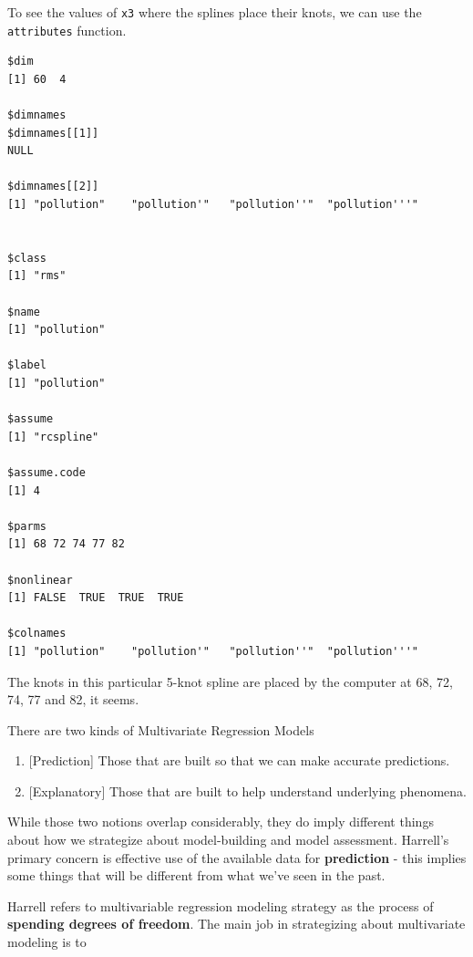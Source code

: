 \documentclass[]{book}
\newenvironment{Shaded}{\begin{snugshade}}{\end{snugshade}}
\newcommand{\KeywordTok}[1]{\textcolor[rgb]{0.13,0.29,0.53}{\textbf{#1}}}
\newcommand{\DecValTok}[1]{\textcolor[rgb]{0.00,0.00,0.81}{#1}}
\newcommand{\OperatorTok}[1]{\textcolor[rgb]{0.81,0.36,0.00}{\textbf{#1}}}
\newcommand{\NormalTok}[1]{#1}
\providecommand{\tightlist}{%
  \setlength{\itemsep}{0pt}\setlength{\parskip}{0pt}}
\theoremstyle{definition}
\theoremstyle{definition}
\theoremstyle{definition}
\theoremstyle{remark}
\begin{document}
To see the values of \texttt{x3} where the splines place their knots, we
can use the \texttt{attributes} function.

\begin{Shaded}
\end{Shaded}

\begin{verbatim}
$dim
[1] 60  4

$dimnames
$dimnames[[1]]
NULL

$dimnames[[2]]
[1] "pollution"    "pollution'"   "pollution''"  "pollution'''"


$class
[1] "rms"

$name
[1] "pollution"

$label
[1] "pollution"

$assume
[1] "rcspline"

$assume.code
[1] 4

$parms
[1] 68 72 74 77 82

$nonlinear
[1] FALSE  TRUE  TRUE  TRUE

$colnames
[1] "pollution"    "pollution'"   "pollution''"  "pollution'''"
\end{verbatim}

The knots in this particular 5-knot spline are placed by the computer at
68, 72, 74, 77 and 82, it seems.

There are two kinds of Multivariate Regression Models

\begin{enumerate}
\def\labelenumi{\arabic{enumi}.}
\tightlist
\item
  {[}Prediction{]} Those that are built so that we can make accurate
  predictions.
\item
  {[}Explanatory{]} Those that are built to help understand underlying
  phenomena.
\end{enumerate}

While those two notions overlap considerably, they do imply different
things about how we strategize about model-building and model
assessment. Harrell's primary concern is effective use of the available
data for \textbf{prediction} - this implies some things that will be
different from what we've seen in the past.

Harrell refers to multivariable regression modeling strategy as the
process of \textbf{spending degrees of freedom}. The main job in
strategizing about multivariate modeling is to
\end{document}
